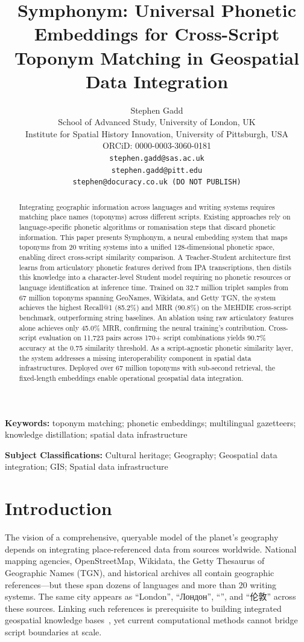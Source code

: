 \documentclass[11pt,a4paper]{article}
\title{Symphonym: Universal Phonetic Embeddings for Cross-Script Toponym Matching in Geospatial Data Integration}
\author{Stephen Gadd\\
\small School of Advanced Study, University of London, UK\\
\small Institute for Spatial History Innovation, University of Pittsburgh, USA\\
\small ORCiD: 0000-0003-3060-0181\\
\small \texttt{stephen.gadd@sas.ac.uk}\\
\small \texttt{stephen.gadd@pitt.edu}\\
\small \texttt{stephen@docuracy.co.uk (DO NOT PUBLISH)}}\\
\date{}
\newcommand{\textar}[1]{{\arabicfont\RL{#1}}}
\newcommand{\textcn}[1]{{\chinesefont #1}}
\begin{document}
\maketitle

\begin{abstract}
Integrating geographic information across languages and writing systems requires matching place names (toponyms) across different scripts. Existing approaches rely on language-specific phonetic algorithms or romanisation steps that discard phonetic information. This paper presents Symphonym, a neural embedding system that maps toponyms from 20 writing systems into a unified 128-dimensional phonetic space, enabling direct cross-script similarity comparison. A Teacher-Student architecture first learns from articulatory phonetic features derived from IPA transcriptions, then distils this knowledge into a character-level Student model requiring no phonetic resources or language identification at inference time. Trained on 32.7 million triplet samples from 67 million toponyms spanning GeoNames, Wikidata, and Getty TGN, the system achieves the highest Recall@1 (85.2\%) and MRR (90.8\%) on the MEHDIE cross-script benchmark, outperforming string baselines. An ablation using raw articulatory features alone achieves only 45.0\% MRR, confirming the neural training's contribution. Cross-script evaluation on 11,723 pairs across 170+ script combinations yields 90.7\% accuracy at the 0.75 similarity threshold. As a script-agnostic phonetic similarity layer, the system addresses a missing interoperability component in spatial data infrastructures. Deployed over 67 million toponyms with sub-second retrieval, the fixed-length embeddings enable operational geospatial data integration.
\end{abstract}

\textbf{Keywords:} toponym matching; phonetic embeddings; multilingual gazetteers; knowledge distillation; spatial data infrastructure

\noindent\textbf{Subject Classifications:} Cultural heritage; Geography; Geospatial data integration; GIS; Spatial data infrastructure


\section{Introduction}
\label{sec:introduction}

The vision of a comprehensive, queryable model of the planet's geography~\citep{goodchild2012digital,guo2020digital} depends on integrating place-referenced data from sources worldwide. National mapping agencies, OpenStreetMap, Wikidata, the Getty Thesaurus of Geographic Names (TGN), and historical archives all contain geographic references---but these span dozens of languages and more than 20 writing systems. The same city appears as ``London'', ``Лондон'', ``\textar{لندن}'', and ``\textcn{伦敦}'' across these sources. Linking such references is prerequisite to building integrated geospatial knowledge bases~\citep{hill2006georeferencing}, yet current computational methods cannot bridge script boundaries at scale.
\end{document}
